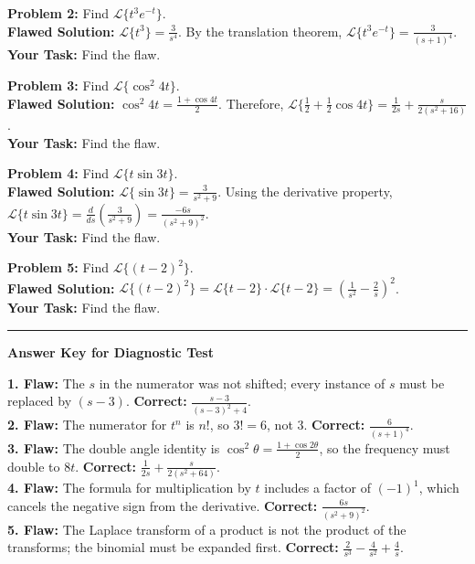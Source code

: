 \documentclass[11pt, a4paper]{article}
\theoremstyle{definition}
\theoremstyle{remark}
\begin{document}
\noindent\textbf{Problem 2:} Find $\mathscr{L}\{t^3 e^{-t}\}$. \\
\textbf{Flawed Solution:} $\mathscr{L}\{t^3\} = \frac{3}{s^4}$. By the translation theorem, $\mathscr{L}\{t^3 e^{-t}\} = \frac{3}{(s+1)^4}$. \\
\textbf{Your Task:} Find the flaw.
\vspace{10pt}

\noindent\textbf{Problem 3:} Find $\mathscr{L}\{\cos^2 4t\}$. \\
\textbf{Flawed Solution:} $\cos^2 4t = \frac{1 + \cos 4t}{2}$. Therefore, $\mathscr{L}\{\frac{1}{2} + \frac{1}{2}\cos 4t\} = \frac{1}{2s} + \frac{s}{2(s^2+16)}$. \\
\textbf{Your Task:} Find the flaw.
\vspace{10pt}

\noindent\textbf{Problem 4:} Find $\mathscr{L}\{t \sin 3t\}$. \\
\textbf{Flawed Solution:} $\mathscr{L}\{\sin 3t\} = \frac{3}{s^2+9}$. Using the derivative property, $\mathscr{L}\{t \sin 3t\} = \frac{d}{ds} \left( \frac{3}{s^2+9} \right) = \frac{-6s}{(s^2+9)^2}$. \\
\textbf{Your Task:} Find the flaw.
\vspace{10pt}

\noindent\textbf{Problem 5:} Find $\mathscr{L}\{(t-2)^2\}$. \\
\textbf{Flawed Solution:} $\mathscr{L}\{(t-2)^2\} = \mathscr{L}\{t-2\} \cdot \mathscr{L}\{t-2\} = \left(\frac{1}{s^2} - \frac{2}{s}\right)^2$. \\
\textbf{Your Task:} Find the flaw.

\vspace{20pt}
\hrule
\vspace{10pt}
\begin{center}
\textbf{Answer Key for Diagnostic Test}
\end{center}
\textbf{1. Flaw:} The $s$ in the numerator was not shifted; every instance of $s$ must be replaced by $(s-3)$. \textbf{Correct:} $\frac{s-3}{(s-3)^2 + 4}$. \\
\textbf{2. Flaw:} The numerator for $t^n$ is $n!$, so $3! = 6$, not $3$. \textbf{Correct:} $\frac{6}{(s+1)^4}$. \\
\textbf{3. Flaw:} The double angle identity is $\cos^2 \theta = \frac{1 + \cos 2\theta}{2}$, so the frequency must double to $8t$. \textbf{Correct:} $\frac{1}{2s} + \frac{s}{2(s^2+64)}$. \\
\textbf{4. Flaw:} The formula for multiplication by $t$ includes a factor of $(-1)^1$, which cancels the negative sign from the derivative. \textbf{Correct:} $\frac{6s}{(s^2+9)^2}$. \\
\textbf{5. Flaw:} The Laplace transform of a product is not the product of the transforms; the binomial must be expanded first. \textbf{Correct:} $\frac{2}{s^3} - \frac{4}{s^2} + \frac{4}{s}$.
\end{document}
